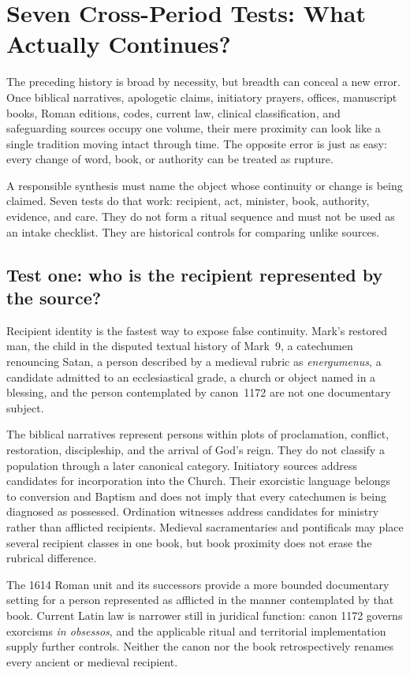 \section{Seven Cross-Period Tests: What Actually Continues?}

The preceding history is broad by necessity, but breadth can conceal a new
error. Once biblical narratives, apologetic claims, initiatory prayers,
offices, manuscript books, Roman editions, codes, current law, clinical
classification, and safeguarding sources occupy one volume, their mere
proximity can look like a single tradition moving intact through time. The
opposite error is just as easy: every change of word, book, or authority can
be treated as rupture.

A responsible synthesis must name the object whose continuity or change is
being claimed. Seven tests do that work: recipient, act, minister, book,
authority, evidence, and care. They do not form a ritual sequence and must not
be used as an intake checklist. They are historical controls for comparing
unlike sources.

\subsection{Test one: who is the recipient represented by the source?}

Recipient identity is the fastest way to expose false continuity. Mark's
restored man, the child in the disputed textual history of Mark~9, a
catechumen renouncing Satan, a person described by a medieval rubric as
\emph{energumenus}, a candidate admitted to an ecclesiastical grade, a church
or object named in a blessing, and the person contemplated by canon~1172 are
not one documentary subject.

The biblical narratives represent persons within plots of proclamation,
conflict, restoration, discipleship, and the arrival of God's reign. They do
not classify a population through a later canonical category. Initiatory
sources address candidates for incorporation into the Church. Their
exorcistic language belongs to conversion and Baptism and does not imply that
every catechumen is being diagnosed as possessed. Ordination witnesses address
candidates for ministry rather than afflicted recipients. Medieval
sacramentaries and pontificals may place several recipient classes in one
book, but book proximity does not erase the rubrical difference.

The 1614 Roman unit and its successors provide a more bounded documentary
setting for a person represented as afflicted in the manner contemplated by
that book. Current Latin law is narrower still in juridical function: canon
1172 governs exorcisms \emph{in obsessos}, and the applicable ritual and
territorial implementation supply further controls. Neither the canon nor the
book retrospectively renames every ancient or medieval recipient.

